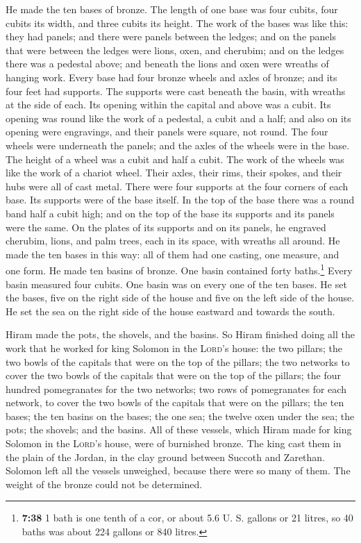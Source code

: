 He made the ten bases of bronze. The length of one base
was four cubits, four cubits its width, and three cubits its height.
 The work of the bases was like this: they had panels;
and there were panels between the ledges;  and on the
panels that were between the ledges were lions, oxen, and cherubim; and
on the ledges there was a pedestal above; and beneath the lions and oxen
were wreaths of hanging work.  Every base had four bronze
wheels and axles of bronze; and its four feet had supports. The supports
were cast beneath the basin, with wreaths at the side of each.
 Its opening within the capital and above was a cubit.
Its opening was round like the work of a pedestal, a cubit and a half;
and also on its opening were engravings, and their panels were square,
not round.  The four wheels were underneath the panels;
and the axles of the wheels were in the base. The height of a wheel was
a cubit and half a cubit.  The work of the wheels was
like the work of a chariot wheel. Their axles, their rims, their spokes,
and their hubs were all of cast metal.  There were four
supports at the four corners of each base. Its supports were of the base
itself.  In the top of the base there was a round band
half a cubit high; and on the top of the base its supports and its
panels were the same.  On the plates of its supports and
on its panels, he engraved cherubim, lions, and palm trees, each in its
space, with wreaths all around.  He made the ten bases in
this way: all of them had one casting, one measure, and one form.
 He made ten basins of bronze. One basin contained forty
baths.\footnote{\textbf{7:38} 1 bath is one tenth of a cor, or about 5.6
  U. S. gallons or 21 litres, so 40 baths was about 224 gallons or 840
  litres.} Every basin measured four cubits. One basin was on every one
of the ten bases.  He set the bases, five on the right
side of the house and five on the left side of the house. He set the sea
on the right side of the house eastward and towards the south.

 Hiram made the pots, the shovels, and the basins. So
Hiram finished doing all the work that he worked for king Solomon in the
\textsc{Lord}'s house:  the two pillars; the two bowls of
the capitals that were on the top of the pillars; the two networks to
cover the two bowls of the capitals that were on the top of the pillars;
 the four hundred pomegranates for the two networks; two
rows of pomegranates for each network, to cover the two bowls of the
capitals that were on the pillars;  the ten bases; the
ten basins on the bases;  the one sea; the twelve oxen
under the sea;  the pots; the shovels; and the basins.
All of these vessels, which Hiram made for king Solomon in the
\textsc{Lord}'s house, were of burnished bronze.  The
king cast them in the plain of the Jordan, in the clay ground between
Succoth and Zarethan.  Solomon left all the vessels
unweighed, because there were so many of them. The weight of the bronze
could not be determined.

